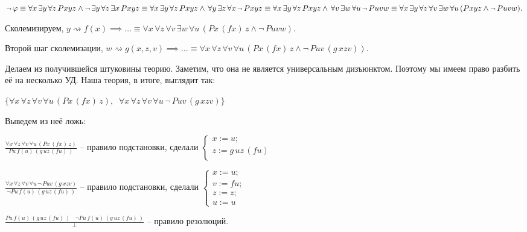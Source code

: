 \documentclass[a4paper, fleqn]{article}
\begin{document}
    $\neg \, \varphi \equiv \forall x \, \exists y \, \forall z \, Pxyz \land \neg \, \exists y \, \forall z \, \exists x  \, Pxyz \equiv \forall x \, \exists y \, \forall z \, Pxyz \land  \, \forall y \, \exists z \, \forall x  \, \neg \, Pxyz \equiv \forall x \, \exists y \, \forall z \, Pxyz \land  \, \forall v \, \exists w \, \forall u  \, \neg \, Puvw \equiv \\ \\ \forall x \, \exists y \, \forall z  \, \forall v \, \exists w \, \forall u \, (Pxyz \land  \neg \, Puvw).$ 
    
    Сколемизируем, $y \rightsquigarrow f(x) \implies \dots \equiv \forall x  \, \forall z  \, \forall v \, \exists w \, \forall u \, (Px \, (fx)\, z \land  \neg \, Puvw).$
    
    Второй шаг сколемизации, $w \rightsquigarrow g(x,z,v) \implies \dots \equiv \forall x \, \forall z  \, \forall v \, \forall u \, (Px \, (fx)\, z \land  \neg \, Puv \, (g \, xzv)). $
    
    Делаем из получившейся штуковины теорию. Заметим, что она не является универсальным дизъюнктом. Поэтому мы имеем право разбить её на несколько УД. Наша теория, в итоге, выглядит так:
    
    $\{\forall x \, \forall z  \, \forall v \, \forall u \, (Px \, (fx)\, z )  , \; \; \forall x \, \forall z  \, \forall v \, \forall u \, \neg \, Puv \, (g \, xzv)\}$
    
    Выведем из неё ложь:
    
    $\frac{\forall x \, \forall z  \, \forall v \, \forall u \, (Px \, (fx)\, z )}{P u \, f(u)\, (g \, uz \, (fu)\,)}$ -- правило подстановки, сделали $\begin{cases}
    x := u; \\
    z := g \, uz \, (fu) \\
    \end{cases}$
    
    $ \frac{\forall x \, \forall z  \, \forall v \, \forall u \, \neg \, Puv \, (g \, xzv)}{\neg Pu \, f(u) \,(g \, uz \, (fu) \, )} $ -- правило подстановки, сделали $\begin{cases}
    x := u; \\
    v := fu; \\
    z := z; \\
    u := u
    \end{cases}$
    
    $\frac{P u \, f(u)\, (g \, uz \, (fu)\,)  \; \; \; \neg Pu \, f(u) \,(g \, uz \, (fu) \, ) }{\perp}$  -- правило резолюций.
    
\end{document}

